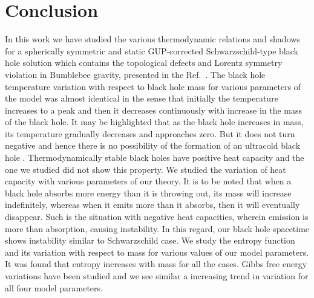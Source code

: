 \documentclass[aps,amsmath,amssymb,showpacs,showkeys]{revtex4}
\begin{document}
\section{Conclusion} \label{conclusion}
\label{sec6}
In this work we have studied the various thermodynamic relations and
shadows for a spherically symmetric and static GUP-corrected 
Schwarzschild-type black hole solution which contains the topological defects 
and Lorentz symmetry violation in Bumblebee gravity, presented in the 
Ref.\ \cite{20}. The black hole temperature variation with respect to
black hole mass for various parameters of the model was almost identical in 
the sense that initially the temperature increases to a peak and then it 
decreases continuously with increase in the mass of the black hole. It 
may be highlighted that as the black hole increases in mass, its temperature 
gradually decreases and approaches zero. But it does not turn negative 
and hence there is no possibility of the formation of an ultracold black 
hole \cite{62}. Thermodynamically stable black holes have positive 
heat capacity and the one we studied did not show this property. 
We studied the variation of heat capacity with various parameters 
of our theory. It is to be noted that when a black hole absorbs more 
energy than it is throwing out, its mass will increase indefinitely, 
whereas when it emits more than it absorbs, then it will eventually 
disappear. Such is the situation with negative heat capacities, 
wherein emission is more than absorption, causing instability. 
In this regard, our black hole spacetime shows instability similar to 
Schwarzschild case. We study the entropy function and its variation with 
respect to mass for various values of our model parameters. It was found that 
entropy increases with mass for all the cases. Gibbs free energy variations 
have been studied and we see similar a increasing trend in variation for all 
four model parameters.
\end{document}
